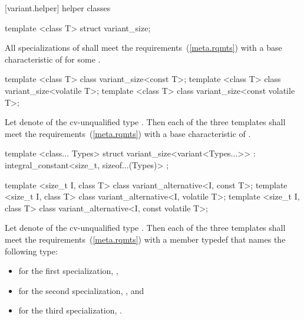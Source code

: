 [variant.helper]{ helper classes}

%
\begin{itemdecl}
template <class T> struct variant_size;
\end{itemdecl}

\begin{itemdescr}
\pnum
\remarks
All specializations of  shall meet the
 requirements~(\ref{meta.rqmts})
with a base characteristic of  for some .
\end{itemdescr}

%
\begin{itemdecl}
template <class T> class variant_size<const T>;
template <class T> class variant_size<volatile T>;
template <class T> class variant_size<const volatile T>;
\end{itemdecl}

\begin{itemdescr}
\pnum
Let  denote  of the cv-unqualified
type . Then each of the three templates shall meet the
 requirements~(\ref{meta.rqmts}) with a
base characteristic of .
\end{itemdescr}

%
\begin{itemdecl}
template <class... Types>
  struct variant_size<variant<Types...>> : integral_constant<size_t, sizeof...(Types)> { };
\end{itemdecl}

%
\begin{itemdecl}
template <size_t I, class T> class variant_alternative<I, const T>;
template <size_t I, class T> class variant_alternative<I, volatile T>;
template <size_t I, class T> class variant_alternative<I, const volatile T>;
\end{itemdecl}

\begin{itemdescr}
\pnum
Let  denote  of the
cv-unqualified type . Then each of the three templates shall
meet the  requirements~(\ref{meta.rqmts}) with a
member typedef  that names the following type:
\begin{itemize}
\item for the first specialization, ,
\item for the second specialization, , and
\item for the third specialization, .
\end{itemize}
\end{itemdescr}

